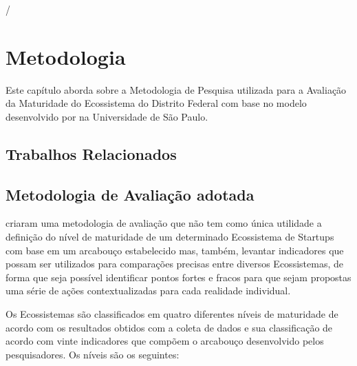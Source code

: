 / \chapter[Metodologia]{Metodologia}
\label{cap-metodologia}

Este capítulo aborda sobre a Metodologia de Pesquisa utilizada para a Avaliação da Maturidade do Ecossistema do Distrito Federal com base no modelo desenvolvido por  na Universidade de São Paulo.

\section{Trabalhos Relacionados}
\label{section:trabalhos_relacionados}

\section{Metodologia de Avaliação adotada}
\label{section:framework_adotado}

 criaram uma metodologia de avaliação que não tem como única utilidade a definição do nível de maturidade de um determinado Ecossistema de Startups com base em um arcabouço estabelecido mas, também, levantar indicadores que possam ser utilizados para comparações precisas entre diversos Ecossistemas, de forma que seja possível identificar pontos fortes e fracos para que sejam propostas uma série de ações contextualizadas para cada realidade individual.

Os Ecossistemas são classificados em quatro diferentes níveis de maturidade de acordo com os resultados obtidos com a coleta de dados e sua classificação de acordo com vinte indicadores que compõem o arcabouço desenvolvido pelos pesquisadores. Os níveis são os seguintes:

